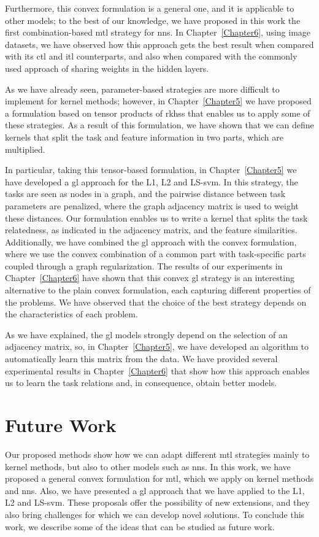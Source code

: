 %
Furthermore, this convex formulation is a general one, and it is applicable to other models; to the best of our knowledge, we have proposed in this work the first combination-based \acrshort{mtl} strategy for \acrshort{nns}.
%
In Chapter~\ref{Chapter6}, using image datasets, we have observed how this approach gets the best result when compared with its \acrshort{ctl} and \acrshort{itl} counterparts, and also when compared with the commonly used approach of sharing weights in the hidden layers.


%
As we have already seen, parameter-based strategies are more difficult to implement for kernel methods; however, in Chapter~\ref{Chapter5} we have proposed a formulation based on tensor products of \acrfull{rkhss} that enables us to apply some of these strategies.
As a result of this formulation, we have shown that we can define kernels that split the task and feature information in two parts, which are multiplied.

In particular, taking this tensor-based formulation, in Chapter~\ref{Chapter5} we have developed a \acrfull{gl} approach for the L1, L2 and LS-\acrshort{svm}. In this strategy, the tasks are seen as nodes in a graph, and the pairwise distance between task parameters are penalized, where the graph adjacency matrix is used to weight these distances.
Our formulation enables us to write a kernel that splits the task relatedness, as indicated in the adjacency matrix, and the feature similarities.
%
Additionally, we have combined the \acrshort{gl} approach with the convex formulation, where we use the convex combination of a common part with task-specific parts coupled through a graph regularization.
%
The results of our experiments in Chapter~\ref{Chapter6} have shown that this convex \acrshort{gl} strategy is an interesting alternative to the plain convex formulation, each capturing different properties of the problems. We have observed that the choice of the best strategy depends on the characteristics of each problem.

As we have explained, the \acrshort{gl} models strongly depend on the selection of an adjacency matrix, so, in Chapter~\ref{Chapter5}, we have developed an algorithm to automatically learn this matrix from the data.
We have provided several experimental results in Chapter~\ref{Chapter6} that show how this approach enables us to learn the task relations and, in consequence, obtain better models.


\section{Future Work}
Our proposed methods show how we can adapt different \acrshort{mtl} strategies mainly to kernel methods, but also to other models such as \acrshort{nns}. 
In this work, we have proposed a general convex formulation for \acrshort{mtl}, which we apply on kernel methods and \acrshort{nns}. Also, we have presented a \acrshort{gl} approach that we have applied to the L1, L2 and LS-\acrshort{svm}.
%
These proposals offer the possibility of new extensions, and they also bring challenges for which we can develop novel solutions. To conclude this work, we describe some of the ideas that can be studied as future work.

